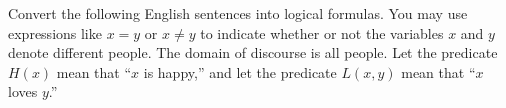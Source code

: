 \documentclass[]{exam}
\begin{document}
\begin{questions}
    \question Convert the following English sentences into logical formulas. You
      may use expressions like $x=y$ or $x\neq y$ to indicate whether or not the
      variables $x$ and $y$ denote different people. The domain of discourse is
      all people. Let the predicate $H(x)$ mean that ``$x$ is happy,'' and let
      the predicate $L(x,y)$ mean that ``$x$ loves $y$.''


      \ifprintanswers\else
      \fi


\end{questions}
\end{document}
